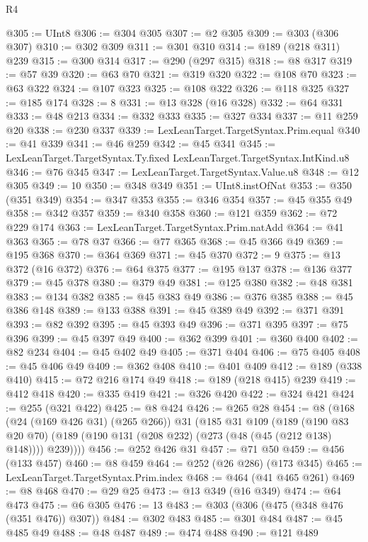 \begin{lexlean}{R4}
\begin{coremodule}
@305 := UInt8
@306 := @304 @305
@307 := @2 @305
@309 := @303 (@306 @307)
@310 := @302 @309
@311 := @301 @310
@314 := @189 (@218 @311) @239
@315 := @300 @314
@317 := @290 (@297 @315)
@318 := @8 @317
@319 := @57 @39
@320 := @63 @70
@321 := @319 @320
@322 := @108 @70
@323 := @63 @322
@324 := @107 @323
@325 := @108 @322
@326 := @118 @325
@327 := @185 @174
@328 := 8
@331 := @13 @328 (@16 @328)
@332 := @64 @331
@333 := @48 @213
@334 := @332 @333
@335 := @327 @334
@337 := @11 @259 @20
@338 := @230 @337
@339 := LexLeanTarget.TargetSyntax.Prim.equal
@340 := @41 @339
@341 := @46 @259
@342 := @45 @341
@345 := LexLeanTarget.TargetSyntax.Ty.fixed LexLeanTarget.TargetSyntax.IntKind.u8
@346 := @76 @345
@347 := LexLeanTarget.TargetSyntax.Value.u8
@348 := @12 @305
@349 := 10
@350 := @348 @349
@351 := UInt8.instOfNat
@353 := @350 (@351 @349)
@354 := @347 @353
@355 := @346 @354
@357 := @45 @355 @49
@358 := @342 @357
@359 := @340 @358
@360 := @121 @359
@362 := @72 @229 @174
@363 := LexLeanTarget.TargetSyntax.Prim.natAdd
@364 := @41 @363
@365 := @78 @37
@366 := @77 @365
@368 := @45 @366 @49
@369 := @195 @368
@370 := @364 @369
@371 := @45 @370
@372 := 9
@375 := @13 @372 (@16 @372)
@376 := @64 @375
@377 := @195 @137
@378 := @136 @377
@379 := @45 @378
@380 := @379 @49
@381 := @125 @380
@382 := @48 @381
@383 := @134 @382
@385 := @45 @383 @49
@386 := @376 @385
@388 := @45 @386 @148
@389 := @133 @388
@391 := @45 @389 @49
@392 := @371 @391
@393 := @82 @392
@395 := @45 @393 @49
@396 := @371 @395
@397 := @75 @396
@399 := @45 @397 @49
@400 := @362 @399
@401 := @360 @400
@402 := @82 @234
@404 := @45 @402 @49
@405 := @371 @404
@406 := @75 @405
@408 := @45 @406 @49
@409 := @362 @408
@410 := @401 @409
@412 := @189 (@338 @410)
@415 := @72 @216 @174 @49
@418 := @189 (@218 @415) @239
@419 := @412 @418
@420 := @335 @419
@421 := @326 @420
@422 := @324 @421
@424 := @255 (@321 @422)
@425 := @8 @424
@426 := @265 @28
@454 := @8
    (@168
      (@24 (@169 @426 @31) (@265 @266))
      @31
      (@185
        @31
        @109
        (@189
          (@190 @83 @20 @70)
          (@189 (@190 @131 (@208 @232) (@273 (@48 (@45 (@212 @138) @148)))) @239))))
@456 := @252 @426 @31
@457 := @71 @50
@459 := @456 (@133 @457)
@460 := @8 @459
@464 := @252 (@26 @286) (@173 @345)
@465 := LexLeanTarget.TargetSyntax.Prim.index
@468 := @464 (@41 @465 @261)
@469 := @8 @468
@470 := @29 @25
@473 := @13 @349 (@16 @349)
@474 := @64 @473
@475 := @6 @305
@476 := 13
@483 := @303 (@306 (@475 (@348 @476 (@351 @476)) @307))
@484 := @302 @483
@485 := @301 @484
@487 := @45 @485 @49
@488 := @48 @487
@489 := @474 @488
@490 := @121 @489

\end{coremodule}
\end{lexlean}
